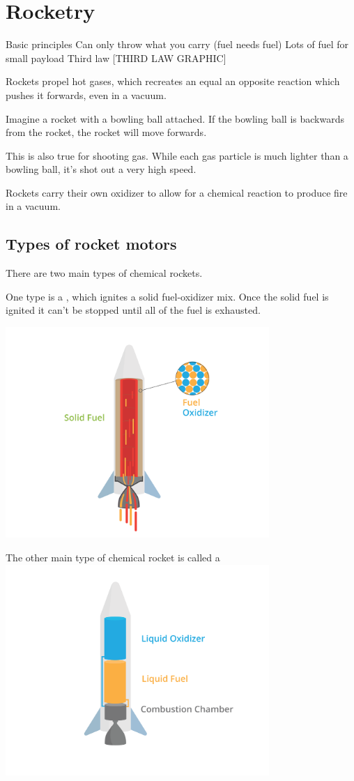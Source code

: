 \chapter{Rocketry}


Basic principles
	Can only throw what you carry (fuel needs fuel)
	Lots of fuel for small payload
	Third law
	[THIRD LAW GRAPHIC]


Rockets propel hot gases, which recreates an equal an opposite reaction which pushes it forwards, even in a vacuum. 

Imagine a rocket with a bowling ball attached. If the bowling ball is backwards from the rocket, the rocket will move forwards. 

This is also true for shooting gas. While each gas particle is much lighter than a bowling ball, it's shot out a very high speed. 

Rockets carry their own oxidizer to allow for a chemical reaction to produce fire in a vacuum. 



\section{Types of rocket motors}

There are two main types of chemical rockets. 

One type is a , which ignites a solid fuel-oxidizer mix. Once the solid fuel is ignited it can't be stopped until all of the fuel is exhausted.

	\includegraphics[width=0.75\textwidth]{solid.png}

The other main type of chemical rocket is called a 
	\includegraphics[width=0.75\textwidth]{liquid.png}

